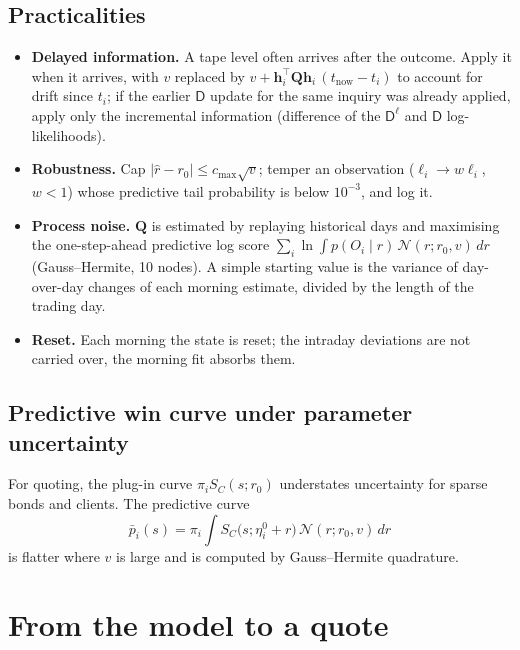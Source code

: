 \documentclass[11pt,a4paper]{article}
\theoremstyle{definition}
\theoremstyle{remark}
\newcommand{\T}{^{\top}}
\newcommand{\bh}{\bm{h}}
\newcommand{\Qm}{\bm{Q}}
\newcommand{\Dl}{\mathsf{D}^{\ell}}
\newcommand{\Dn}{\mathsf{D}}
\begin{document}
\subsection{Practicalities}
\begin{itemize}[itemsep=2pt]
\item \textbf{Delayed information.} A tape level often arrives after the outcome. Apply it when it arrives, with $v$ replaced by $v+\bh_i\T\Qm\bh_i\,(t_{\mathrm{now}}-t_i)$ to account for drift since $t_i$; if the earlier $\Dn$ update for the same inquiry was already applied, apply only the incremental information (difference of the $\Dl$ and $\Dn$ log-likelihoods).
\item \textbf{Robustness.} Cap $|\hat r-r_0|\le c_{\max}\sqrt v$; temper an observation ($\ell_i\to w\ell_i$, $w<1$) whose predictive tail probability is below $10^{-3}$, and log it.
\item \textbf{Process noise.} $\Qm$ is estimated by replaying historical days and maximising the one-step-ahead predictive log score $\sum_i\ln\int p(O_i\mid r)\,\mathcal N(r;r_0,v)\,dr$ (Gauss--Hermite, 10 nodes). A simple starting value is the variance of day-over-day changes of each morning estimate, divided by the length of the trading day.
\item \textbf{Reset.} Each morning the state is reset; the intraday deviations are not carried over, the morning fit absorbs them.
\end{itemize}

\subsection{Predictive win curve under parameter uncertainty}
For quoting, the plug-in curve $\pi_iS_C(s;r_0)$ understates uncertainty for sparse bonds and clients. The predictive curve
\begin{equation}\label{eq:predictive}
\bar p_i(s)=\pi_i\int S_C\bigl(s;\eta^0_i+r\bigr)\,\mathcal N(r;r_0,v)\,dr
\end{equation}
is flatter where $v$ is large and is computed by Gauss--Hermite quadrature.

\section{From the model to a quote}\label{sec:quote}
\end{document}
